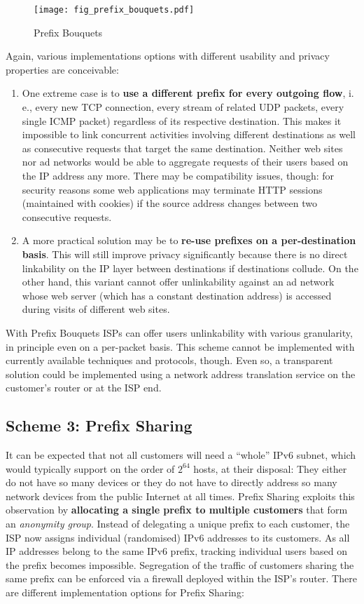 \documentclass{easychair}
\begin{document}
\begin{figure}[htbp]
        \centering
                \texttt{[image: fig\_prefix\_bouquets.pdf]}
        \caption{Prefix Bouquets}
        \label{fig:fig_prefix_bouquets}
\end{figure}

Again, various implementations options with different usability and privacy properties are conceivable:

\begin{enumerate}
	\item One extreme case is to \textbf{use a different prefix for every outgoing flow}, i.\,e., every new TCP connection, every stream of related UDP packets, every single ICMP packet) regardless of its respective destination. This makes it impossible to link concurrent activities involving different destinations as well as consecutive requests that target the same destination. Neither web sites nor ad networks would be able to aggregate requests of their users based on the IP address any more. There may be compatibility issues, though: for security reasons some web applications may terminate HTTP sessions (maintained with cookies) if the source address changes between two consecutive requests.
	\item A more practical solution may be to \textbf{re-use prefixes on a per-destination basis}. This will still improve privacy significantly because there is no direct linkability on the IP layer between destinations if destinations collude. On the other hand, this variant cannot offer unlinkability against an ad network whose web server (which has a constant destination address) is accessed during visits of different web sites.
\end{enumerate}

With Prefix Bouquets ISPs can offer users unlinkability with various granularity, in principle even on a per-packet basis. This scheme cannot be implemented with currently available techniques and protocols, though. Even so, a transparent solution could be implemented using a network address translation service on the customer's router or at the ISP end.

\subsection{Scheme 3: Prefix Sharing}

It can be expected that not all customers will need a ``whole'' IPv6 subnet, which would typically support on the order of $2^{64}$ hosts, at their disposal: They either do not have so many devices or they do not have to directly address so many network devices from the public Internet at all times. Prefix Sharing exploits this observation by \textbf{allocating a single prefix to multiple customers} that form an \emph{anonymity group}. Instead of delegating a unique prefix to each customer, the ISP now assigns individual (randomised) IPv6 addresses to its customers. As all IP addresses belong to the same IPv6 prefix, tracking individual users based on the prefix becomes impossible. Segregation of the  traffic of customers sharing the same prefix can be enforced via a firewall deployed within the ISP's router. There are different implementation options for Prefix Sharing:
\end{document}
